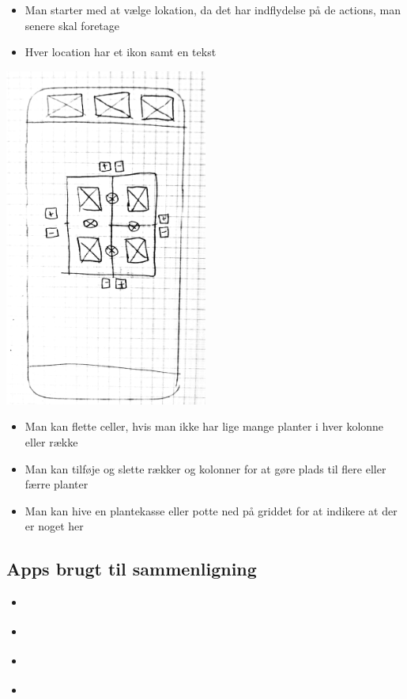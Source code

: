 \begin{itemize}
    \item Man starter med at vælge lokation, da det har indflydelse på de actions, man senere skal foretage
    \item Hver location har et ikon samt en tekst
\end{itemize}

\includegraphics[width=0.5\textwidth]{img/s1-8.jpg}\\

\begin{itemize}
    \item Man kan flette celler, hvis man ikke har lige mange planter i hver kolonne eller række
    \item Man kan tilføje og slette rækker og kolonner for at gøre plads til flere eller færre planter
    \item Man kan hive en plantekasse eller potte ned på griddet for at indikere at der er noget her
\end{itemize}

\subsection{Apps brugt til sammenligning}
\label{other-apps}

\begin{itemize}
    \item \cite{gardroid}
    \item \cite{gleyco}
    \item \cite{garden-organizer}
    \item \cite{planter}
\end{itemize}
